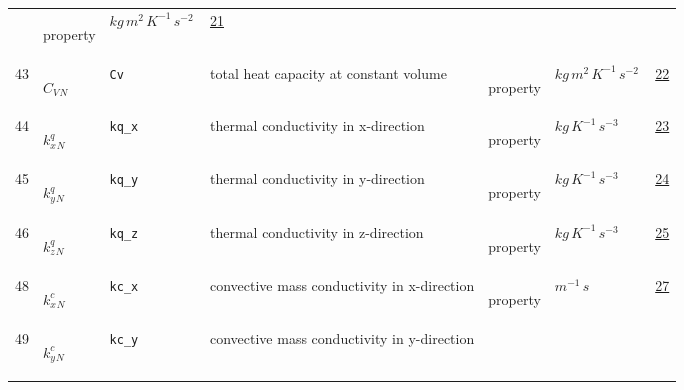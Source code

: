 \begin{longtable}{|p{1cm}|p{2.5cm}|p{4.5cm}|p{8cm}|p{3.0cm}|p{3cm}|p{1cm}|}
             & \begin{lay}property \end{lay}
             & $ kg \,m^{2} \,K^{-1} \,s^{-2} \, $
             &                 \hyperlink{"e:21"}{ 21 }
                 \\
            43
             & \hypertarget{"v:43"}{ $ {{C_V}}{_{N}} $}
             & \verb|Cv|
             & total heat capacity at constant volume
             & \begin{lay}property \end{lay}
             & $ kg \,m^{2} \,K^{-1} \,s^{-2} \, $
             &                 \hyperlink{"e:22"}{ 22 }
                 \\
            44
             & \hypertarget{"v:44"}{ $ {{k^q_x}}{_{N}} $}
             & \verb|kq_x|
             & thermal conductivity in x-direction
             & \begin{lay}property \end{lay}
             & $ kg \,K^{-1} \,s^{-3} \, $
             &                 \hyperlink{"e:23"}{ 23 }
                 \\
            45
             & \hypertarget{"v:45"}{ $ {{k^q_y}}{_{N}} $}
             & \verb|kq_y|
             & thermal conductivity in y-direction
             & \begin{lay}property \end{lay}
             & $ kg \,K^{-1} \,s^{-3} \, $
             &                 \hyperlink{"e:24"}{ 24 }
                 \\
            46
             & \hypertarget{"v:46"}{ $ {{k^q_z}}{_{N}} $}
             & \verb|kq_z|
             & thermal conductivity in z-direction
             & \begin{lay}property \end{lay}
             & $ kg \,K^{-1} \,s^{-3} \, $
             &                 \hyperlink{"e:25"}{ 25 }
                 \\
            48
             & \hypertarget{"v:48"}{ $ {{k^c_x}}{_{N}} $}
             & \verb|kc_x|
             & convective mass conductivity in x-direction
             & \begin{lay}property \end{lay}
             & $ m^{-1} \,s \, $
             &                 \hyperlink{"e:27"}{ 27 }
                 \\
            49
             & \hypertarget{"v:49"}{ $ {{k^c_y}}{_{N}} $}
             & \verb|kc_y|
             & convective mass conductivity in y-direction

\end{longtable}
